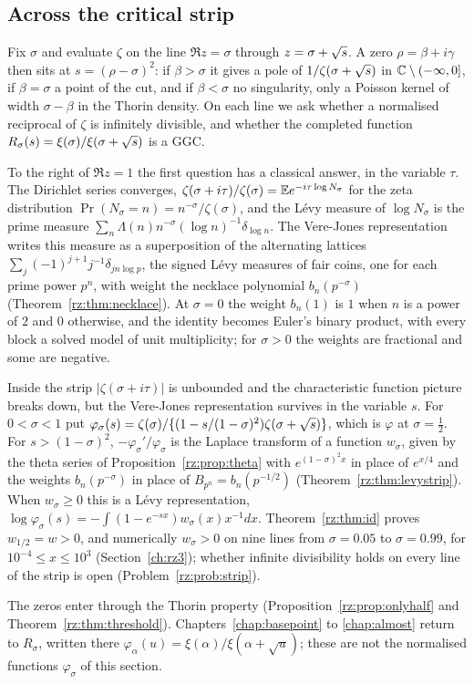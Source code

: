 \subsection{Across the critical strip}\label{rz:sec:strip}

Fix $\sigma$ and evaluate $\zeta$ on the line $\Re z=\sigma$ through $z=\sigma+\sqrt{s}$. A zero $\rho=\beta+i\gamma$ then sits at $s=(\rho-\sigma)^2$: if $\beta>\sigma$ it gives a pole of $1/\zeta(\sigma+\sqrt{s})$ in $\mathbb{C}\setminus(-\infty,0]$, if $\beta=\sigma$ a point of the cut, and if $\beta<\sigma$ no singularity, only a Poisson kernel of width $\sigma-\beta$ in the Thorin density. On each line we ask whether a normalised reciprocal of $\zeta$ is infinitely divisible, and whether the completed function $R_\sigma(s)=\xi(\sigma)/\xi(\sigma+\sqrt{s})$ is a GGC.

To the right of $\Re z=1$ the first question has a classical answer, in the variable $\tau$. The Dirichlet series converges, $\zeta(\sigma+i\tau)/\zeta(\sigma)=\mathbb{E} e^{-i\tau\log N_\sigma}$ for the zeta distribution $\Pr(N_\sigma=n)=n^{-\sigma}/\zeta(\sigma)$, and the L\'evy measure of $\log N_\sigma$ is the prime measure $\sum_n\Lambda(n)n^{-\sigma}(\log n)^{-1}\delta_{\log n}$. The Vere-Jones representation writes this measure as a superposition of the alternating lattices $\sum_j(-1)^{j+1}j^{-1}\delta_{jn\log p}$, the signed L\'evy measures of fair coins, one for each prime power $p^n$, with weight the necklace polynomial $b_n(p^{-\sigma})$ (Theorem~\ref{rz:thm:necklace}). At $\sigma=0$ the weight $b_n(1)$ is $1$ when $n$ is a power of $2$ and $0$ otherwise, and the identity becomes Euler's binary product, with every block a solved model of unit multiplicity; for $\sigma>0$ the weights are fractional and some are negative.

Inside the strip $|\zeta(\sigma+i\tau)|$ is unbounded and the characteristic function picture breaks down, but the Vere-Jones representation survives in the variable $s$. For $0<\sigma<1$ put $\varphi_\sigma(s)=\zeta(\sigma)/\{(1-s/(1-\sigma)^2)\zeta(\sigma+\sqrt{s})\}$, which is $\varphi$ at $\sigma=\frac12$. For $s>(1-\sigma)^2$, $-\varphi_\sigma'/\varphi_\sigma$ is the Laplace transform of a function $w_\sigma$, given by the theta series of Proposition~\ref{rz:prop:theta} with $e^{(1-\sigma)^2x}$ in place of $e^{x/4}$ and the weights $b_n(p^{-\sigma})$ in place of $B_{p^n}=b_n(p^{-1/2})$ (Theorem~\ref{rz:thm:levystrip}). When $w_\sigma\ge0$ this is a L\'evy representation, $\log\varphi_\sigma(s)=-\int(1-e^{-sx})w_\sigma(x)x^{-1}dx$. Theorem~\ref{rz:thm:id} proves $w_{1/2}=w>0$, and numerically $w_\sigma>0$ on nine lines from $\sigma=0.05$ to $\sigma=0.99$, for $10^{-4}\le x\le10^3$ (Section~\ref{ch:rz3}); whether infinite divisibility holds on every line of the strip is open (Problem~\ref{rz:prob:strip}).

The zeros enter through the Thorin property (Proposition~\ref{rz:prop:onlyhalf} and Theorem~\ref{rz:thm:threshold}). Chapters~\ref{chap:basepoint} to \ref{chap:almost} return to $R_\sigma$, written there $\varphi_\alpha(u)=\xi(\alpha)/\xi(\alpha+\sqrt u)$; these are not the normalised functions $\varphi_\sigma$ of this section.
